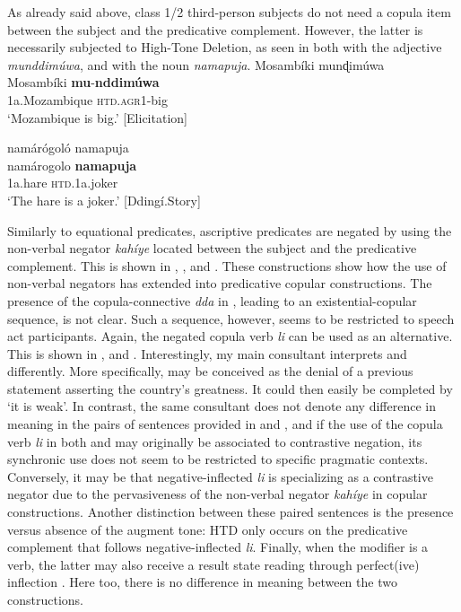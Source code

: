 \documentclass[output=paper,colorlinks=true, citecolor=brown,draftmode]{langscibook}
\begin{document}
As already said above, class 1/2 third-person subjects do not need a copula item between the subject and the predicative complement. However, the latter is necessarily subjected to High-Tone Deletion, as seen in both  with the adjective \textit{munddimúwa}, and  with the noun \textit{namapuja}.
\newpage
\ea\label{ex:cuw:20} Mosambíki munɖimúwa  \\ 
    \gll Mosambíki \textbf{mu}{}-\textbf{nddimúwa}\\
        1a.Mozambique \textsc{htd.agr1}{}-big \\
    \glt ‘Mozambique is big.’ [Elicitation]
\z 


\ea\label{ex:cuw:21} namárógoló namapuja   \\
    \gll namárogolo \textbf{namapuja} \\
         1a.hare \textsc{htd}.1a.joker \\
    \glt ‘The hare is a joker.’ [Ddingí.Story]
\z 

Similarly to equational predicates, ascriptive predicates are negated by using the non-verbal negator \textit{kahíye} located between the subject and the predicative complement. This is shown in , ,  and . These constructions show how the use of non-verbal negators has extended into predicative copular constructions. The presence of the copula-connective \textit{dda} in , leading to an existential-copular sequence, is not clear. Such a sequence, however, seems to be restricted to speech act participants. Again, the negated copula verb \textit{li} can be used as an alternative. This is shown in ,  and . Interestingly, my main consultant interprets  and  differently. More specifically,  may be conceived as the denial of a previous statement asserting the country’s greatness. It could then easily be completed by ‘it is weak’. In contrast, the same consultant does not denote any difference in meaning in the pairs of sentences provided in  and , and if the use of the copula verb \textit{li} in both  and  may originally be associated to contrastive negation, its synchronic use does not seem to be restricted to specific pragmatic contexts. Conversely, it may be that negative-inflected \textit{li} is specializing as a contrastive negator due to the pervasiveness of the non-verbal negator \textit{kahíye} in copular constructions. Another distinction between these paired sentences is the presence versus absence of the augment tone: HTD only occurs on the predicative complement that follows negative-inflected \textit{li}. Finally, when the modifier is a verb, the latter may also receive a result state reading through perfect(ive) inflection . Here too, there is no difference in meaning between the two constructions.
\end{document}
